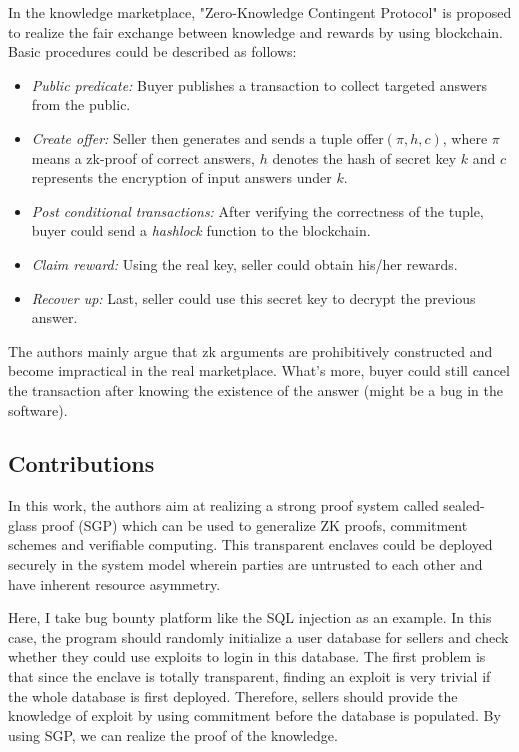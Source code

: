 \documentclass[conference]{IEEEtran}
\begin{document}
In the knowledge marketplace, "Zero-Knowledge Contingent Protocol" is proposed to realize the fair exchange between knowledge and rewards by using blockchain.
%
Basic procedures could be described as follows:
\begin{itemize}
    \item \textit{Public predicate:} Buyer publishes a transaction to collect targeted answers from the public.
    \item \textit{Create offer:} Seller then generates and sends a tuple offer$(\pi,h,c)$, where $\pi$ means a zk-proof of correct answers, $h$ denotes the hash of secret key $k$ and $c$ represents the encryption of input answers under $k$.
    \item \textit{Post conditional transactions:} After verifying the correctness of the tuple, buyer could send a \textit{hashlock} function to the blockchain.
    \item \textit{Claim reward:} Using the real key, seller could obtain his/her rewards.
    \item \textit{Recover up:} Last, seller could use this secret key to decrypt the previous answer.
\end{itemize}

The authors mainly argue that zk arguments are prohibitively constructed and become impractical in the real marketplace.
%
What's more, buyer could still cancel the transaction after knowing the existence of the answer (might be a bug in the software). 

\subsection{Contributions}
In this work, the authors aim at realizing a strong proof system called sealed-glass proof (SGP) which can be used to generalize ZK proofs, commitment schemes and verifiable computing.
%
This transparent enclaves could be deployed securely in the system model wherein parties are untrusted to each other and have inherent resource asymmetry.

Here, I take bug bounty platform like the SQL injection as an example.
%
In this case, the program should randomly initialize a user database for sellers and check whether they could use exploits to login in this database.
%
The first problem is that since the enclave is totally transparent, finding an exploit is very trivial if the whole database is first deployed.
%
Therefore, sellers should provide the knowledge of exploit by using commitment before the database is populated.
%
By using SGP, we can realize the proof of the knowledge.
\end{document}
